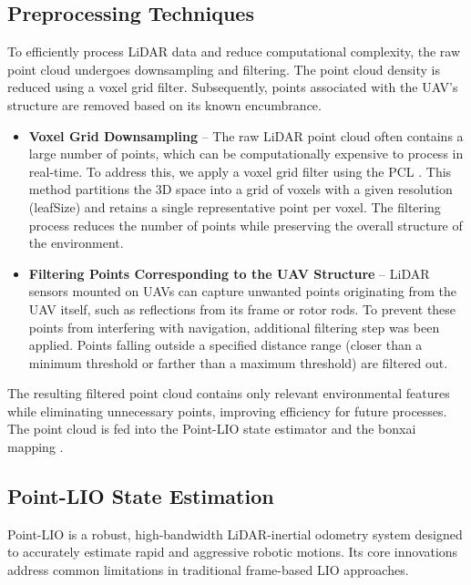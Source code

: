         \subsection{Preprocessing Techniques}
            To efficiently process \ac{LiDAR} data and reduce computational complexity, the raw point cloud undergoes downsampling and filtering. 
            The point cloud density is reduced using a voxel grid filter. 
            Subsequently, points associated with the \ac{UAV}'s structure are removed based on its known encumbrance.
            \begin{itemize}
                \item \textbf{Voxel Grid Downsampling} -- The raw \ac{LiDAR} point cloud often contains a large number of points, which can be computationally expensive to process in real-time. 
                To address this, we apply a voxel grid filter using the \ac{PCL} \cite{pcl_voxelgrid}. 
                This method partitions the 3D space into a grid of voxels with a given resolution (leafSize) and retains a single representative point per voxel. 
                The filtering process reduces the number of points while preserving the overall structure of the environment.
                \item \textbf{Filtering Points Corresponding to the UAV Structure} -- \ac{LiDAR} sensors mounted on \ac{UAV}s can capture unwanted points originating from the \ac{UAV} itself, such as reflections from its frame or rotor rods. 
                To prevent these points from interfering with navigation, additional filtering step was been applied.
                Points falling outside a specified distance range (closer than a minimum threshold or farther than a maximum threshold) are filtered out.
            \end{itemize}
            The resulting filtered point cloud contains only relevant environmental features while eliminating unnecessary points, improving efficiency for future processes.
            The point cloud is fed into the \ac{Point-LIO} \cite{point_lio_paper} state estimator and the bonxai mapping \cite{Bonxai2025}. 

        \subsection{Point-LIO State Estimation}
            \ac{Point-LIO} \cite{point_lio_paper} is a robust, high-bandwidth \ac{LiDAR}-inertial odometry system designed to accurately estimate rapid and aggressive robotic motions. 
            Its core innovations address common limitations in traditional frame-based LIO approaches.

